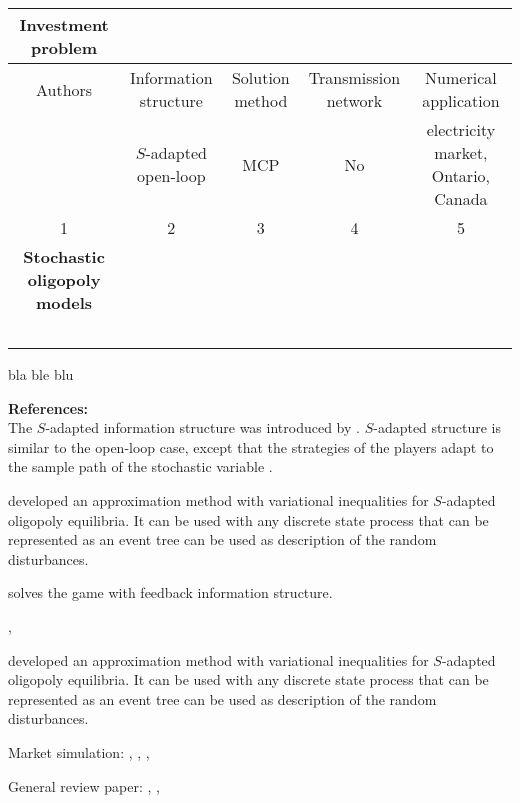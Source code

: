 \begin{landscape}

\begin{table}
\scriptsize
\begin{tabular}[h]{ccccc}
\hline
\textbf{Investment problem}\\
\hline
  Authors & Information structure & Solution method & Transmission network & Numerical application \\
\hline
\cite{Genc2007} & $S$-adapted open-loop & MCP & No & electricity market, Ontario, Canada\\
1 & 2 & 3 & 4 & 5 \\
\hline
\textbf{Stochastic oligopoly models}\\
\hline
\cite{Salant1982}\\
\cite{Wolf1997}\\
\cite{Haurie2001}\\
\cite{Haurie2002}\\
\cite{Murto2004}
\end{tabular}
\end{table}
bla ble blu


\textbf{References:} \cite{Salant1982, Wolf1997, Haurie2001, Haurie2002, Pineau2003, Murto2004}\\


The $S$-adapted information structure was introduced by \cite{Haurie1990}.
$S$-adapted structure is similar to the open-loop case, except that the strategies of the players adapt to the sample path of the stochastic variable \citep[see][pg. 128]{Pineau2003}.

\cite{Haurie2002} developed an approximation method with variational inequalities for $S$-adapted oligopoly equilibria. It can be used with any discrete state process that can be represented as an event tree can be used as description of the random disturbances.

\cite{Murto2004} solves the game with feedback information structure.

\cite{Haurie2001}, \cite{Genc2007}

developed an approximation method with variational inequalities for $S$-adapted oligopoly equilibria. It can be used with any discrete state process that can be represented as an event tree can be used as description of the random disturbances.


Market simulation: \cite{Torre2003}, \cite{Valenzuela2007}, \cite{Hobbs2001},\cite{Otero-Novas2000}

General review paper: \cite{Neuhoff2005}, \cite{Ventosa2005}, \cite{Kahn1998}

\end{landscape}



